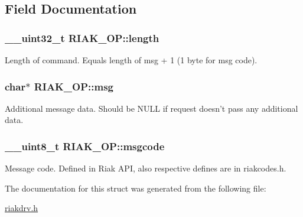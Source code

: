 \subsection{Field Documentation}
\hypertarget{structRIAK__OP_ad9a9ebef38f4c35c0cb13f331bb817b8}{
\subsubsection[{length}]{\setlength{\rightskip}{0pt plus 5cm}\_\-\_\-uint32\_\-t {\bf RIAK\_\-OP::length}}}
\label{structRIAK__OP_ad9a9ebef38f4c35c0cb13f331bb817b8}
Length of command. Equals length of msg + 1 (1 byte for msg code). \hypertarget{structRIAK__OP_ab3584d73e5c9a8486ee78b239a35d151}{
\subsubsection[{msg}]{\setlength{\rightskip}{0pt plus 5cm}char$\ast$ {\bf RIAK\_\-OP::msg}}}
\label{structRIAK__OP_ab3584d73e5c9a8486ee78b239a35d151}
Additional message data. Should be NULL if request doesn't pass any additional data. \hypertarget{structRIAK__OP_abde5e88f658ba818a8b083d8927fc59f}{
\subsubsection[{msgcode}]{\setlength{\rightskip}{0pt plus 5cm}\_\-\_\-uint8\_\-t {\bf RIAK\_\-OP::msgcode}}}
\label{structRIAK__OP_abde5e88f658ba818a8b083d8927fc59f}
Message code. Defined in Riak API, also respective defines are in riakcodes.h. 

The documentation for this struct was generated from the following file:\begin{DoxyCompactItemize}
\item 
\hyperlink{riakdrv_8h}{riakdrv.h}\end{DoxyCompactItemize}
